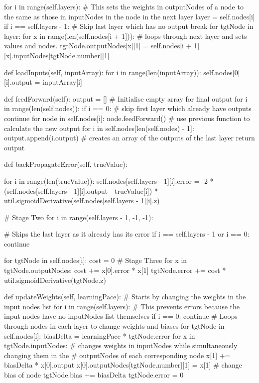 \documentclass{report}
\begin{document}
\begin{python}
        for i in range(self.layers):  # This sets the weights in outputNodes of a node to the same as those in inputNodes in the node in the next layer
            layer = self.nodes[i]
            if i == self.layers - 1:  # Skip last layer which has no output
                break
            for tgtNode in layer:
                for x in range(len(self.nodes[i + 1])):
                    # loops through next layer and sets values and nodes.
                    tgtNode.outputNodes[x][1] = self.nodes[i + 1][x].inputNodes[tgtNode.number][1]

    def loadInputs(self, inputArray):
        for i in range(len(inputArray)):
            self.nodes[0][i].output = inputArray[i]

    def feedForward(self):
        output = []  # Initialise empty array for final output
        for i in range(len(self.nodes)):
            if i == 0:  # skip first layer which already have outputs
                continue
            for node in self.nodes[i]:
                node.feedForward()  # use previous function to calculate the new output
        for i in self.nodes[len(self.nodes) - 1]:
            output.append(i.output)  # creates an array of the outputs of the last layer
        return output

    def backPropagateError(self, trueValue):

        for i in range(len(trueValue)):
            self.nodes[self.layers - 1][i].error = -2 *
                    (self.nodes[self.layers - 1][i].output - trueValue[i]) *
                    util.sigmoidDerivative(self.nodes[self.layers - 1][i].z)

        # Stage Two
        for i in range(self.layers - 1, -1, -1):

            # Skips the last layer as it already has its error
            if i == self.layers - 1 or i == 0:
                continue

            for tgtNode in self.nodes[i]:
                cost = 0
                # Stage Three
                for x in tgtNode.outputNodes:
                    cost += x[0].error * x[1]
                tgtNode.error += cost * util.sigmoidDerivative(tgtNode.z)

    def updateWeights(self, learningPace):
        # Starts by changing the weights in the input nodes list
        for i in range(self.layers):
            # This prevents errors because the input nodes have no inputNodes list themselves
            if i == 0:
                continue
            # Loops through nodes in each layer to change weights and biases
            for tgtNode in self.nodes[i]:
                biasDelta = learningPace * tgtNode.error
                for x in tgtNode.inputNodes:
                    # changes weights in inputNodes while simultaneously changing them in the
                    # outputNodes of each corresponding node
                    x[1] += biasDelta * x[0].output
                    x[0].outputNodes[tgtNode.number][1] = x[1]
                # change bias of node
                tgtNode.bias += biasDelta
                tgtNode.error = 0


\end{python}
\end{document}

